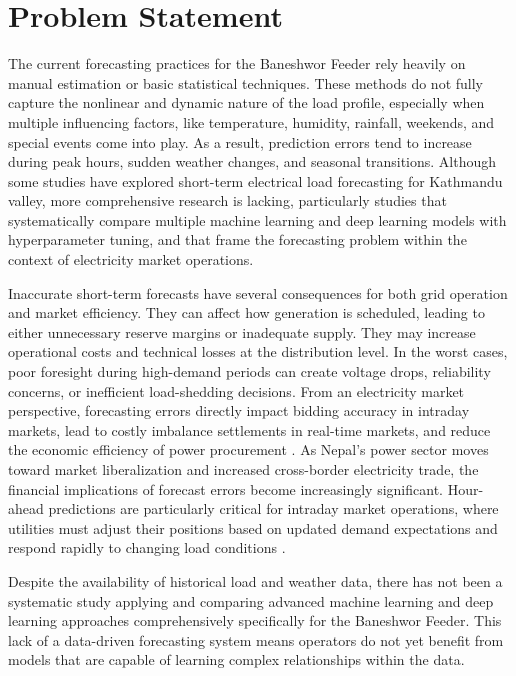 \documentclass[oneside, 12pt]{book}
\numberwithin{equation}{chapter}
\newcommand{\sizexii}{\fontsize{12pt}{6pt}\selectfont}
\begin{document}
\section{\sizexii Problem Statement}
The current forecasting practices for the Baneshwor Feeder rely heavily on manual
estimation or basic statistical techniques. These methods do not fully capture the
nonlinear and dynamic nature of the load profile, especially when multiple influencing
factors, like temperature, humidity, rainfall, weekends, and special events come into
play. As a result, prediction errors tend to increase during peak hours, sudden weather
changes, and seasonal transitions. Although some studies have explored short-term electrical load forecasting for Kathmandu valley, more comprehensive research is lacking, particularly studies that systematically compare multiple machine learning and deep learning models with hyperparameter tuning, and that frame the forecasting problem within the context of electricity market operations.

Inaccurate short-term forecasts have several consequences for both grid operation and market efficiency. They can affect how
generation is scheduled, leading to either unnecessary reserve margins or inadequate
supply. They may increase operational costs and technical losses at the distribution
level. In the worst cases, poor foresight during high-demand periods can create voltage
drops, reliability concerns, or inefficient load-shedding decisions. From an electricity market perspective, forecasting errors directly impact bidding accuracy in intraday markets, lead to costly imbalance settlements in real-time markets, and reduce the economic efficiency of power procurement \parencite{conejo2010decision}. As Nepal's power sector moves toward market liberalization and increased cross-border electricity trade, the financial implications of forecast errors become increasingly significant. Hour-ahead predictions are particularly critical for intraday market operations, where utilities must adjust their positions based on updated demand expectations and respond rapidly to changing load conditions \parencite{zareipour2010electricity}.

Despite the availability of historical load and weather data, there has not been
a systematic study applying and comparing advanced machine learning and deep
learning approaches comprehensively specifically for the Baneshwor Feeder. This lack of a data-driven forecasting system means operators do not yet benefit from models that are capable of learning complex relationships within the data.
\end{document}

